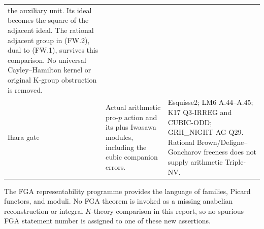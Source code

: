\begin{longtable}{>{\raggedright\arraybackslash}p{}
>{\raggedright\arraybackslash}p{}
>{\raggedright\arraybackslash}p{}}
the auxiliary unit. Its ideal becomes the square of the
adjacent ideal. The rational adjacent group in (FW.2),
dual to (FW.1), survives this comparison. No universal
Cayley--Hamilton kernel or original K-group obstruction is removed.\\
Ihara gate &
Actual arithmetic pro-$p$ action and its plus Iwasawa modules,
including the cubic companion errors. &
Esquisse2; LM6 A.44--A.45; K17 Q3-IRREG and CUBIC-ODD;
GRH\_NIGHT AG-Q29. Rational Brown/Deligne--Goncharov
freeness does not supply arithmetic Triple-NV.\\
\bottomrule
\end{longtable}
\normalsize

The FGA representability programme provides the language of
families, Picard functors, and moduli. No FGA theorem is
invoked as a missing anabelian reconstruction or integral
$K$-theory comparison in this report, so no spurious FGA
statement number is assigned to one of these new assertions.
